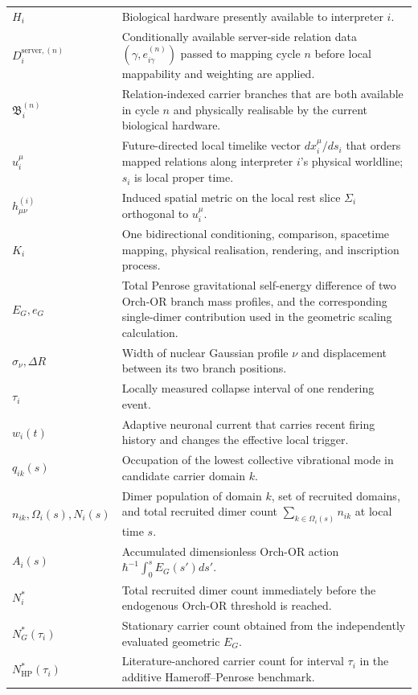 \begin{table}[H]
\begin{tabular}{p{3.0cm}p{9.8cm}}
$H_i$ & Biological hardware presently available to interpreter $i$. \\
$D_i^{\mathrm{server},(n)}$ & Conditionally available server-side relation data $(\gamma,e_{i\gamma}^{(n)})$ passed to mapping cycle $n$ before local mappability and weighting are applied. \\
$\mathfrak B_i^{(n)}$ & Relation-indexed carrier branches that are both available in cycle $n$ and physically realisable by the current biological hardware. \\
$u_i^\mu$ & Future-directed local timelike vector $dx_i^\mu/ds_i$ that orders mapped relations along interpreter $i$'s physical worldline; $s_i$ is local proper time. \\
$h_{\mu\nu}^{(i)}$ & Induced spatial metric on the local rest slice $\Sigma_i$ orthogonal to $u_i^\mu$. \\
$K_i$ & One bidirectional conditioning, comparison, spacetime mapping, physical realisation, rendering, and inscription process. \\
$E_G,e_G$ & Total Penrose gravitational self-energy difference of two Orch-OR branch mass profiles, and the corresponding single-dimer contribution used in the geometric scaling calculation. \\
$\sigma_\nu,\Delta R$ & Width of nuclear Gaussian profile $\nu$ and displacement between its two branch positions. \\
$\tau_i$ & Locally measured collapse interval of one rendering event. \\
$w_i(t)$ & Adaptive neuronal current that carries recent firing history and changes the effective local trigger. \\
$q_{ik}(s)$ & Occupation of the lowest collective vibrational mode in candidate carrier domain $k$. \\
$n_{ik},\Omega_i(s),N_i(s)$ & Dimer population of domain $k$, set of recruited domains, and total recruited dimer count $\sum_{k\in\Omega_i(s)}n_{ik}$ at local time $s$. \\
$A_i(s)$ & Accumulated dimensionless Orch-OR action $\hbar^{-1}\int_0^sE_G(s')ds'$. \\
$N_i^*$ & Total recruited dimer count immediately before the endogenous Orch-OR threshold is reached. \\
$N_G^*(\tau_i)$ & Stationary carrier count obtained from the independently evaluated geometric $E_G$. \\
$N_{\mathrm{HP}}^*(\tau_i)$ & Literature-anchored carrier count for interval $\tau_i$ in the additive Hameroff--Penrose benchmark. \\

\end{tabular}
\end{table}
